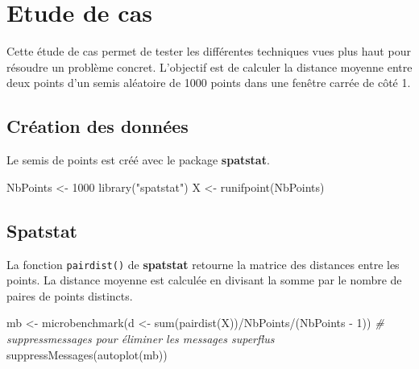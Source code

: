 \documentclass[
  11pt,
  french,
  a4paper,
  extrafontsizes,onecolumn,openright
  ]{memoir}
\newenvironment{Shaded}{\begin{snugshade}}{\end{snugshade}}
\newcommand{\CommentTok}[1]{\textcolor[rgb]{0.56,0.35,0.01}{\textit{#1}}}
\newcommand{\DecValTok}[1]{\textcolor[rgb]{0.00,0.00,0.81}{#1}}
\newcommand{\FunctionTok}[1]{\textcolor[rgb]{0.00,0.00,0.00}{#1}}
\newcommand{\NormalTok}[1]{#1}
\newcommand{\OtherTok}[1]{\textcolor[rgb]{0.56,0.35,0.01}{#1}}
\newcommand{\SpecialCharTok}[1]{\textcolor[rgb]{0.00,0.00,0.00}{#1}}
\newcommand{\StringTok}[1]{\textcolor[rgb]{0.31,0.60,0.02}{#1}}
\begin{document}
\hypertarget{sec:cas}{%
\section{Etude de cas}\label{sec:cas}}

Cette étude de cas permet de tester les différentes techniques vues plus haut pour résoudre un problème concret.
L'objectif est de calculer la distance moyenne entre deux points d'un semis aléatoire de 1000 points dans une fenêtre carrée de côté 1.

\hypertarget{cruxe9ation-des-donnuxe9es}{%
\subsection{Création des données}\label{cruxe9ation-des-donnuxe9es}}

Le semis de points est créé avec le package \textbf{spatstat}.

\scriptsize

\begin{Shaded}
\begin{Highlighting}[]
\NormalTok{NbPoints }\OtherTok{\textless{}{-}} \DecValTok{1000}
\FunctionTok{library}\NormalTok{(}\StringTok{"spatstat"}\NormalTok{)}
\NormalTok{X }\OtherTok{\textless{}{-}} \FunctionTok{runifpoint}\NormalTok{(NbPoints)}
\end{Highlighting}
\end{Shaded}

\normalsize

\hypertarget{spatstat}{%
\subsection{Spatstat}\label{spatstat}}

La fonction \texttt{pairdist()} de \textbf{spatstat} retourne la matrice des distances entre les points.
La distance moyenne est calculée en divisant la somme par le nombre de paires de points distincts.

\scriptsize

\begin{Shaded}
\begin{Highlighting}[]
\NormalTok{mb }\OtherTok{\textless{}{-}} \FunctionTok{microbenchmark}\NormalTok{(d }\OtherTok{\textless{}{-}} \FunctionTok{sum}\NormalTok{(}\FunctionTok{pairdist}\NormalTok{(X))}\SpecialCharTok{/}\NormalTok{NbPoints}\SpecialCharTok{/}\NormalTok{(NbPoints }\SpecialCharTok{{-}} 
    \DecValTok{1}\NormalTok{))}
\CommentTok{\# suppressmessages pour éliminer les messages superflus}
\FunctionTok{suppressMessages}\NormalTok{(}\FunctionTok{autoplot}\NormalTok{(mb))}
\end{Highlighting}
\end{Shaded}
\end{document}

